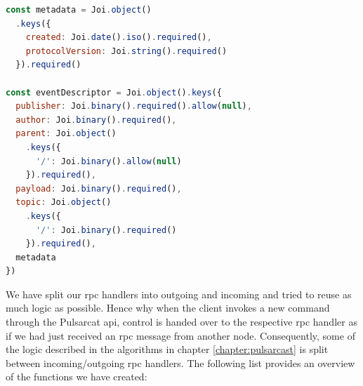 \begin{lstlisting}[language=JavaScript, float=h, caption={Joi schema for and event descriptor},label={joi-schema-event-descriptor}]
const metadata = Joi.object()
  .keys({
    created: Joi.date().iso().required(),
    protocolVersion: Joi.string().required()
  }).required()

const eventDescriptor = Joi.object().keys({
  publisher: Joi.binary().required().allow(null),
  author: Joi.binary().required(),
  parent: Joi.object()
    .keys({
      '/': Joi.binary().allow(null)
    }).required(),
  payload: Joi.binary().required(),
  topic: Joi.object()
    .keys({
      '/': Joi.binary().required()
    }).required(),
  metadata
})
\end{lstlisting}

We have split our \acrshort{rpc} handlers into outgoing and incoming and tried
to reuse as much logic as possible. Hence why when the client invokes a new
command through the Pulsarcat \acrshort{api}, control is handed over to the
respective \acrshort{rpc} handler as if we had just received an \acrshort{rpc}
message from another node. Consequently, some of the logic described in the
algorithms in chapter \ref{chapter:pulsarcast} is split between
incoming/outgoing \acrshort{rpc} handlers. The following list provides an
overview of the functions we have created:

